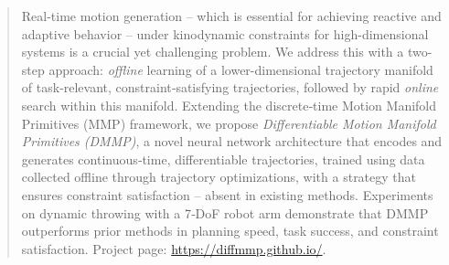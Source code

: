 \begin{abstract}
Real-time motion generation -- which is essential for achieving reactive and adaptive behavior -- under kinodynamic constraints for high-dimensional systems is a crucial yet challenging problem.  
We address this with a two-step approach: \emph{offline} learning of a lower-dimensional trajectory manifold of task‑relevant, constraint‑satisfying trajectories, followed by rapid \emph{online} search within this manifold.  
Extending the discrete‑time Motion Manifold Primitives (MMP) framework, we propose \emph{Differentiable Motion Manifold Primitives (DMMP)}, a novel neural network architecture that encodes and generates continuous‑time, differentiable trajectories, trained using data collected offline through trajectory optimizations, with a strategy that ensures constraint satisfaction -- absent in existing methods.
Experiments on dynamic throwing with a 7‑DoF robot arm demonstrate that DMMP outperforms prior methods in planning speed, task success, and constraint satisfaction.
Project page: \href{https://diffmmp.github.io/}{https://diffmmp.github.io/}.
\end{abstract}

